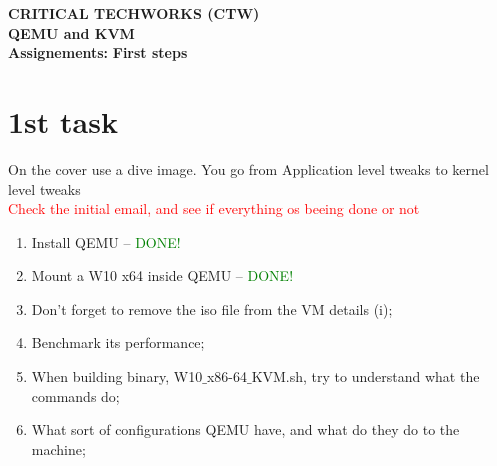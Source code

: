 \documentclass[11pt, a4paper, oneside]{article}
\date{} %
\theoremstyle{definition}
\begin{document}
\sloppy
\justifying


\fancyhead{}

\Large\textbf{CRITICAL TECHWORKS (CTW)}\\
\singlespacing
\Large\textbf{QEMU and KVM}\\

\singlespacing
\singlespacing
\singlespacing
\textbf{Assignements:}
\singlespacing
\indent\indent\indent\indent \textbf{First steps}


\vfill
\pagebreak
\section*{1st task}

On the cover use a dive image. You go from Application level tweaks to kernel level tweaks\\
\textcolor{red}{Check the initial email, and see if everything os beeing done or not}\\

\begin{enumerate}
	\item Install QEMU -- \textcolor{green}{DONE!}
	\item Mount a W10 x64 inside QEMU -- \textcolor{green}{DONE!}
	\item Don't forget to remove the iso file from the VM details (i);	
	\item Benchmark its performance;
	\item When building binary, W10$\_$x86-64$\_$KVM.sh, try to understand what the commands do;
	\item What sort of configurations QEMU have, and what do they do to the machine;
\end{enumerate}
\end{document}
